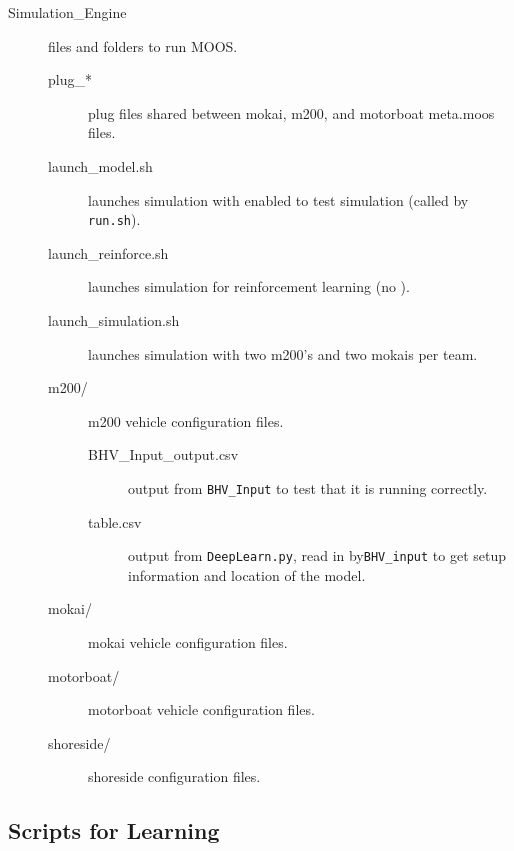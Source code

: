 \documentclass[onecolumn,letterpaper,11pt]{article}
\begin{document}
\begin{description}
\begin{description}
	\end{description}
	\vspace{0.3in}
	\item[Simulation\_Engine] files and folders to run MOOS. 
	\begin{description}
		\item[plug\_*] plug files shared between mokai, m200, and motorboat meta.moos files.
		\vspace{0.15in}
		\item[launch\_model.sh] launches simulation with  enabled to test simulation (called by \texttt{run.sh}).
		\vspace{0.15in}
		\item[launch\_reinforce.sh] launches simulation for reinforcement learning (no ).
		\vspace{0.15in}
		\item[launch\_simulation.sh] launches simulation with two m200's and two mokais per team.
		\vspace{0.15in}
		\item[m200/] m200 vehicle configuration files.
		\begin{description}
			\item[BHV\_Input\_output.csv] output from \texttt{BHV\_Input} to test that it is running correctly.
			\vspace{0.15in}
			\item[table.csv] output from \texttt{DeepLearn.py}, read in by\texttt{BHV\_input} to get setup information and location of the model.
			\vspace{0.15in}
		\end{description}
		\item[mokai/] mokai vehicle configuration files.
		\vspace{0.15in}
		\item[motorboat/] motorboat vehicle configuration files.
		\vspace{0.15in}
		\item[shoreside/] shoreside configuration files.
	\end{description}
\end{description}

\subsection{Scripts for Learning}
\end{document}
